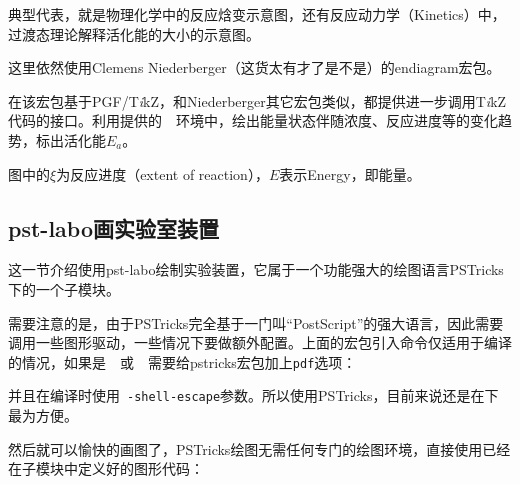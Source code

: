 \documentclass[a4paper,UTF8,zihao = -4]{ctexart} %
\providecommand{\tikzlg}{PGF/T\textit{i}kZ}
\newcommand{\tkznm}{T\textit{i}kZ}
\begin{document}
典型代表，就是物理化学中的反应焓变示意图，还有反应动力学（Kinetics）中，过渡态理论解释活化能的大小的示意图。

这里依然使用Clemens Niederberger（这货太有才了是不是）的\textsf{endiagram}宏包。

\begin{dispListing}
\usepackage{endiagram}  
\end{dispListing}

在该宏包基于\tikzlg{}，和Niederberger其它宏包类似，都提供进一步调用\tkznm{}代码的接口。利用提供的~~环境中，绘出能量状态伴随浓度、反应进度等的变化趋势，标出活化能$E_a$。

\begin{dispExample}
\begin{endiagram}
  \ShowEa[label,label-pos=.3]
\end{endiagram}
\end{dispExample}

图中的$\xi$为反应进度（extent of reaction），$E$表示Energy，即能量。

\subsection{\textsf{pst-labo}画实验室装置}
\label{sec:pst-labo}

这一节介绍使用\textsf{pst-labo}绘制实验装置，它属于一个功能强大的绘图语言PSTricks下的一个子模块。

\begin{dispListing}
\usepackage{pstricks} %
\usepackage{pst-labo} %
\end{dispListing}

需要注意的是，由于PSTricks完全基于一门叫“PostScript”的强大语言，因此需要调用一些图形驱动，一些情况下要做额外配置。上面的宏包引入命令仅适用于编译的情况，如果是~~或~~需要给\textsf{pstricks}宏包加上\texttt{pdf}选项：

\begin{dispListing}
\usepackage[pdf]{pstricks}
\end{dispListing}

\noindent 并且在编译时使用~\texttt{-shell-escape}参数。所以使用\textsf{PSTricks}，目前来说还是在下最为方便。

然后就可以愉快的画图了，PSTricks绘图无需任何专门的绘图环境，直接使用已经在子模块中定义好的图形代码：
\end{document}
